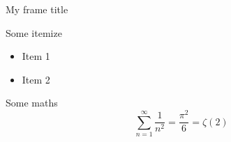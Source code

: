 \documentclass{beamer}
\begin{document}
\begin{frame}{My frame title}
 \begin{block}{Some itemize}
  \begin{itemize}
   \item \alert{Item 1}
   \item Item 2
  \end{itemize}
 \end{block}
 \begin{block}{Some maths}
 \[\sum_{n=1}^{\infty}\frac{1}{n^2}=\frac{\pi^2}{6}=\zeta(2)\]
\end{block}
\end{frame}
\end{document}
